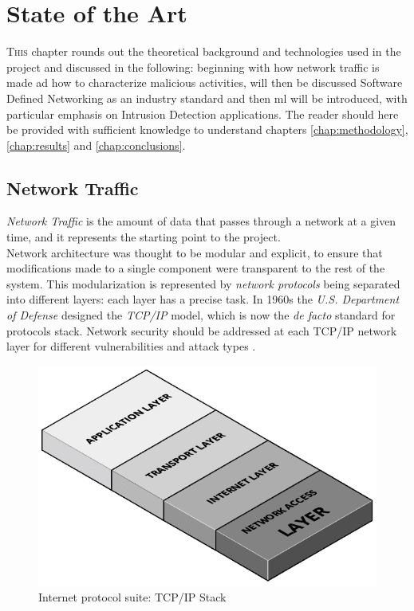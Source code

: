 \chapter{State of the Art}
\label{chap:state-of-the-art}

\lettrine[lines=4, findent=3pt, nindent=0pt]{T}{his} chapter rounds out the theoretical background and technologies used in the project and discussed in the following: beginning with how network traffic is made ad how to characterize malicious activities, will then be discussed Software Defined Networking as an industry standard and then \gls{ml} will be introduced, with particular emphasis on Intrusion Detection applications. The reader should here be provided with sufficient knowledge to understand chapters \ref{chap:methodology}, \ref{chap:results} and \ref{chap:conclusions}.


\section{Network Traffic}
\label{sec:network-traffic}

\textit{Network Traffic} is the amount of data that passes through a network at a given time, and it represents the starting point to the project. \\ Network architecture was thought to be modular and explicit, to ensure that modifications made to a single component were transparent to the rest of the system. This modularization is represented by \textit{network protocols} being separated into different layers: each layer has a precise task. In 1960s the \textit{U.S. Department of Defense} designed the \textit{TCP/IP} model, which is now the \textit{de facto} standard for protocols stack. Network security should be addressed at each TCP/IP network layer for different vulnerabilities and attack types \cite{Zaman2009}.

\begin{figure}[h!]
    \centering
    \includegraphics[scale=0.3]{assets/figures/chapter2/TCP_IP Stack.png}
    \caption{Internet protocol suite: TCP/IP Stack}
    \label{fig:TCP/IP-stack}
\end{figure}

